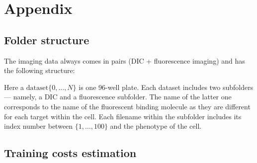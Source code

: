 \section{Appendix}\label{appendix:first}
\subsection{Folder structure}
The imaging data always comes in pairs (DIC + fluorescence imaging) and has the following structure:


Here a $\text{dataset}\{0, \ldots, N\}$ is one 96-well plate. Each dataset includes two subfolders --- namely, a DIC and a fluorescence subfolder. The name of the latter one corresponds to the name of the fluorescent binding molecule as they are different for each target within the cell. Each filename within the subfolder includes its index number between $\{1, \ldots, 100\}$ and the phenotype of the cell.

\subsection{Training costs estimation}
